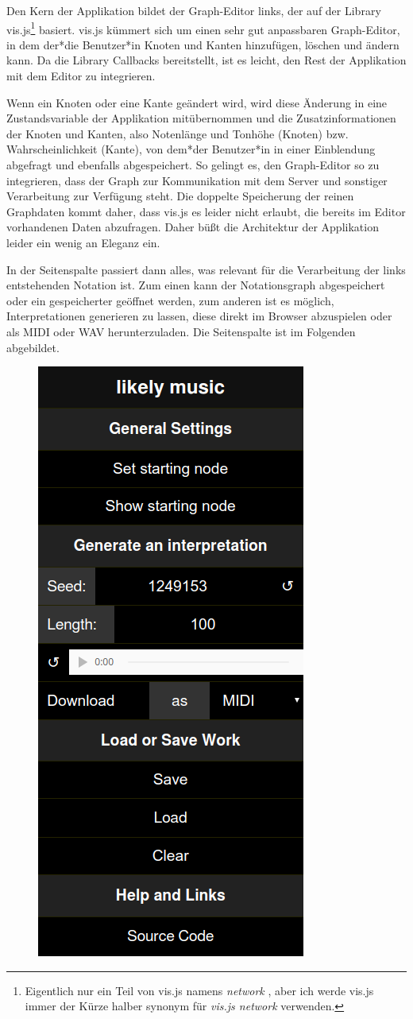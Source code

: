 \documentclass[a4paper,twocolumn]{article}
\begin{document}
Den Kern der Applikation bildet der Graph-Editor links, der auf der Library
vis.js\footnote{Eigentlich nur ein Teil von vis.js namens {\it network}
\cite{visjs_network}, aber
ich werde vis.js immer der Kürze halber synonym für {\it vis.js network} verwenden.}
\cite{visjs} basiert. vis.js kümmert sich um einen sehr gut anpassbaren
Graph-Editor, in dem der*die Benutzer*in Knoten und Kanten hinzufügen, löschen und
ändern kann. Da die Library Callbacks \cite{wikipedia_callback} bereitstellt,
ist es leicht, den Rest der Applikation mit dem Editor zu integrieren.

Wenn ein Knoten oder eine Kante geändert wird, wird diese Änderung in eine
Zustandsvariable
der Applikation mitübernommen und die Zusatzinformationen der Knoten und
Kanten, also Notenlänge und Tonhöhe (Knoten) bzw. Wahrscheinlichkeit (Kante),
von dem*der Benutzer*in in einer Einblendung abgefragt und ebenfalls
abgespeichert. So gelingt es, den
Graph-Editor so zu integrieren, dass der Graph zur Kommunikation mit dem Server
und sonstiger Verarbeitung zur Verfügung steht. Die doppelte Speicherung der
reinen Graphdaten kommt daher, dass
vis.js es leider nicht erlaubt, die bereits im Editor vorhandenen Daten
abzufragen. Daher büßt die Architektur der Applikation leider ein wenig
an Eleganz ein.

In der Seitenspalte passiert dann alles, was relevant für die Verarbeitung der
links entstehenden Notation ist. Zum einen kann der Notationsgraph abgespeichert
oder ein gespeicherter geöffnet werden, zum anderen ist es möglich,
Interpretationen generieren zu lassen, diese direkt im Browser abzuspielen oder
als MIDI oder WAV herunterzuladen. Die Seitenspalte ist im Folgenden abgebildet.

\begin{figure}
  \begin{center}
    \includegraphics[width=.25\textwidth]{screenshots/sidebar}
  \end{center}
\end{figure}
\end{document}
